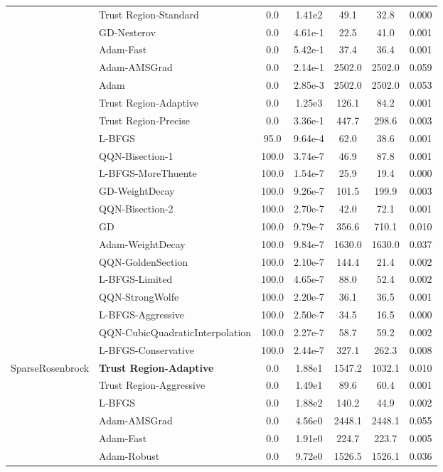 \documentclass{article}
\begin{document}
\begin{table}[htbp]
{\begin{tabular}{p{2.5cm}p{2.5cm}*{5}{c}}
 & Trust Region-Standard & 0.0 & 1.41e2 & 49.1 & 32.8 & 0.000 \\
 & GD-Nesterov & 0.0 & 4.61e-1 & 22.5 & 41.0 & 0.001 \\
 & Adam-Fast & 0.0 & 5.42e-1 & 37.4 & 36.4 & 0.001 \\
 & Adam-AMSGrad & 0.0 & 2.14e-1 & 2502.0 & 2502.0 & 0.059 \\
 & Adam & 0.0 & 2.85e-3 & 2502.0 & 2502.0 & 0.053 \\
 & Trust Region-Adaptive & 0.0 & 1.25e3 & 126.1 & 84.2 & 0.001 \\
 & Trust Region-Precise & 0.0 & 3.36e-1 & 447.7 & 298.6 & 0.003 \\
 & L-BFGS & 95.0 & 9.64e-4 & 62.0 & 38.6 & 0.001 \\
 & QQN-Bisection-1 & 100.0 & 3.74e-7 & 46.9 & 87.8 & 0.001 \\
 & L-BFGS-MoreThuente & 100.0 & 1.54e-7 & 25.9 & 19.4 & 0.000 \\
 & GD-WeightDecay & 100.0 & 9.26e-7 & 101.5 & 199.9 & 0.003 \\
 & QQN-Bisection-2 & 100.0 & 2.70e-7 & 42.0 & 72.1 & 0.001 \\
 & GD & 100.0 & 9.79e-7 & 356.6 & 710.1 & 0.010 \\
 & Adam-WeightDecay & 100.0 & 9.84e-7 & 1630.0 & 1630.0 & 0.037 \\
 & QQN-GoldenSection & 100.0 & 2.10e-7 & 144.4 & 21.4 & 0.002 \\
 & L-BFGS-Limited & 100.0 & 4.65e-7 & 88.0 & 52.4 & 0.002 \\
 & QQN-StrongWolfe & 100.0 & 2.20e-7 & 36.1 & 36.5 & 0.001 \\
 & L-BFGS-Aggressive & 100.0 & 2.50e-7 & 34.5 & 16.5 & 0.000 \\
 & QQN-CubicQuadraticInterpolation & 100.0 & 2.27e-7 & 58.7 & 59.2 & 0.002 \\
 & L-BFGS-Conservative & 100.0 & 2.44e-7 & 327.1 & 262.3 & 0.008 \\
\midrule
\multirow{25}{*}{SparseRosenbrock} & \textbf{Trust Region-Adaptive} & 0.0 & 1.88e1 & 1547.2 & 1032.1 & 0.010 \\
 & Trust Region-Aggressive & 0.0 & 1.49e1 & 89.6 & 60.4 & 0.001 \\
 & L-BFGS & 0.0 & 1.88e2 & 140.2 & 44.9 & 0.002 \\
 & Adam-AMSGrad & 0.0 & 4.56e0 & 2448.1 & 2448.1 & 0.055 \\
 & Adam-Fast & 0.0 & 1.91e0 & 224.7 & 223.7 & 0.005 \\
 & Adam-Robust & 0.0 & 9.72e0 & 1526.5 & 1526.1 & 0.036 \\

\end{tabular}}
\end{table}
\end{document}
